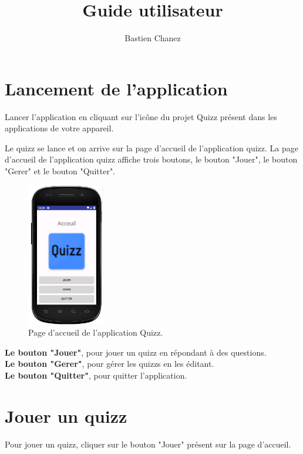 \documentclass[a4paper]{report}
\begin{document}

\title{Guide utilisateur}
\author{Bastien Chanez}

\maketitle

\renewcommand{\contentsname}{Sommaire}
\tableofcontents


\chapter{Lancement de l'application}
Lancer l'application en cliquant sur l'icône du projet Quizz présent dans les applications de votre appareil.

Le quizz se lance et on arrive sur la page d'accueil de l'application quizz. 
La page d'accueil de l'application quizz affiche trois boutons, le bouton "Jouer", le bouton "Gerer" et le bouton "Quitter".

\begin{figure}[h]
\centering
\includegraphics[width=0.3\textwidth]{accueil.png}
\caption{\label{fig:Accueil}Page d'accueil de l'application Quizz.}
\end{figure}

\textbf{Le bouton "Jouer"}, pour jouer un quizz en répondant à des questions.\\
\textbf{Le bouton "Gerer"}, pour gérer les quizzs en les éditant.\\
\textbf{Le bouton "Quitter"}, pour quitter l'application.	

\chapter{Jouer un quizz}
Pour jouer un quizz, cliquer sur le bouton "Jouer" présent sur la page d'accueil.
\end{document}
